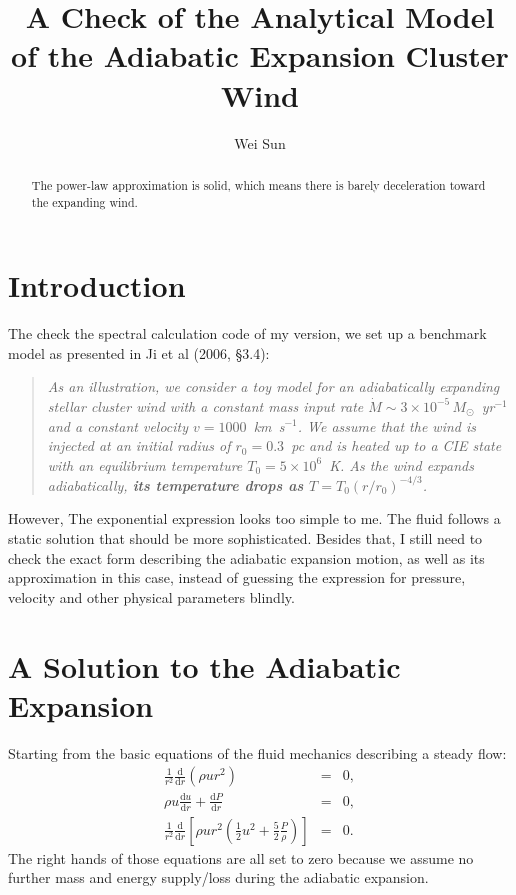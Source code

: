 \documentclass[preprint,12pt,longnamesfirst]{aastex}
\newcommand{\ud}{\mathrm{d}}
\begin{document}
\title{A Check of the Analytical Model of the Adiabatic
Expansion Cluster Wind}

\author{Wei Sun}

\begin{abstract}

The power-law approximation is solid, which means there is barely
deceleration toward the expanding wind.

\end{abstract}


\section{Introduction} %

The check the spectral calculation code of my version, we set up a
benchmark model as presented in Ji et al (2006, \S3.4):
\begin{quote}
\textit{As an illustration, we consider a toy model for an
adiabatically expanding stellar cluster wind with a constant mass
input rate $\dot{M}\sim3\times10^{-5}\,M_\odot$~yr$^{-1}$ and a
constant velocity $v=1000$~km~s$^{-1}$. We assume that the wind is
injected at an initial radius of $r_0=0.3$~pc and is heated up to
a CIE state with an equilibrium temperature $T_0=5\times10^6$~K.
As the wind expands adiabatically,
\textbf{its temperature drops as $T=T_0(r/r_0)^{-4/3}$}.}
\end{quote}

However, The exponential expression looks too simple to me. The
fluid follows a static solution that should be more sophisticated.
Besides that, I still need to check the exact form describing the
adiabatic expansion motion, as well as its approximation in this
case, instead of guessing the expression for pressure, velocity
and other physical parameters blindly.

\section{A Solution to the Adiabatic Expansion}\label{sec2}

Starting from the basic equations of the fluid mechanics describing
a steady flow:
\begin{eqnarray}
  \frac{1}{r^2}\frac{\ud}{\ud r}\left(\rho ur^2\right) &=& 0, \\
  \rho u\frac{\ud u}{\ud r}+\frac{\ud P}{\ud r} &=& 0, \\
  \frac{1}{r^2}\frac{\ud}{\ud r}\left[\rho{}ur^2\left(\frac{1}{2}u^2 +
    \frac{5}{2}\frac{P}{\rho}\right) \right] &=& 0.
\end{eqnarray}
The right hands of those equations are all set to zero because we
assume no further mass and energy supply/loss during the adiabatic
expansion.
\end{document}
